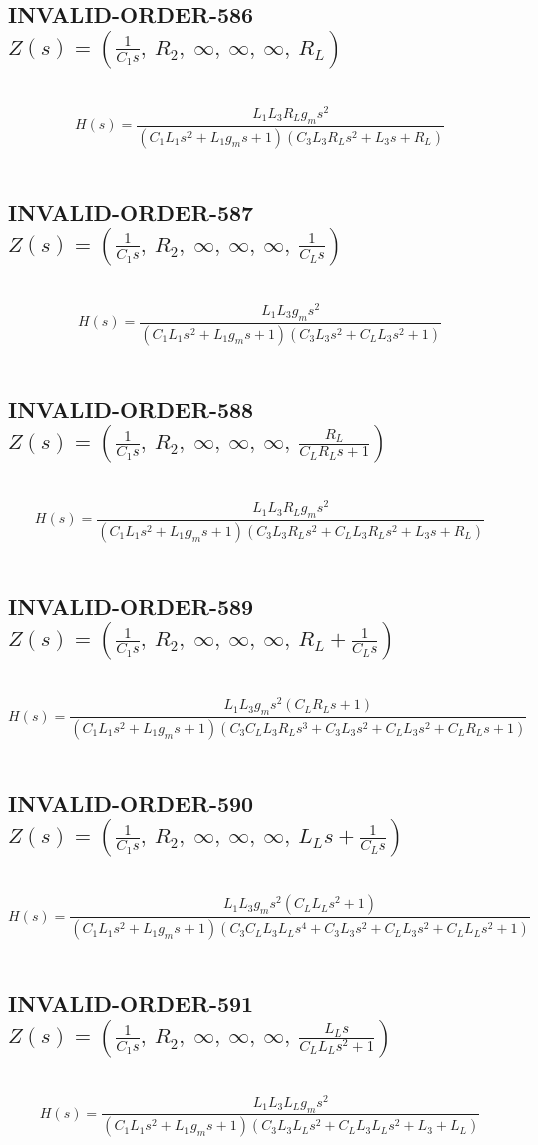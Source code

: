 \documentclass{article}
\begin{document}
\subsection{INVALID-ORDER-586 $Z(s) = \left( \frac{1}{C_{1} s}, \  R_{2}, \  \infty, \  \infty, \  \infty, \  R_{L}\right)$ } \ 
\textbf{\[H(s) = \frac{L_{1} L_{3} R_{L} g_{m} s^{2}}{\left(C_{1} L_{1} s^{2} + L_{1} g_{m} s + 1\right) \left(C_{3} L_{3} R_{L} s^{2} + L_{3} s + R_{L}\right)}\] } \ 
\subsection{INVALID-ORDER-587 $Z(s) = \left( \frac{1}{C_{1} s}, \  R_{2}, \  \infty, \  \infty, \  \infty, \  \frac{1}{C_{L} s}\right)$ } \ 
\textbf{\[H(s) = \frac{L_{1} L_{3} g_{m} s^{2}}{\left(C_{1} L_{1} s^{2} + L_{1} g_{m} s + 1\right) \left(C_{3} L_{3} s^{2} + C_{L} L_{3} s^{2} + 1\right)}\] } \ 
\subsection{INVALID-ORDER-588 $Z(s) = \left( \frac{1}{C_{1} s}, \  R_{2}, \  \infty, \  \infty, \  \infty, \  \frac{R_{L}}{C_{L} R_{L} s + 1}\right)$ } \ 
\textbf{\[H(s) = \frac{L_{1} L_{3} R_{L} g_{m} s^{2}}{\left(C_{1} L_{1} s^{2} + L_{1} g_{m} s + 1\right) \left(C_{3} L_{3} R_{L} s^{2} + C_{L} L_{3} R_{L} s^{2} + L_{3} s + R_{L}\right)}\] } \ 
\subsection{INVALID-ORDER-589 $Z(s) = \left( \frac{1}{C_{1} s}, \  R_{2}, \  \infty, \  \infty, \  \infty, \  R_{L} + \frac{1}{C_{L} s}\right)$ } \ 
\textbf{\[H(s) = \frac{L_{1} L_{3} g_{m} s^{2} \left(C_{L} R_{L} s + 1\right)}{\left(C_{1} L_{1} s^{2} + L_{1} g_{m} s + 1\right) \left(C_{3} C_{L} L_{3} R_{L} s^{3} + C_{3} L_{3} s^{2} + C_{L} L_{3} s^{2} + C_{L} R_{L} s + 1\right)}\] } \ 
\subsection{INVALID-ORDER-590 $Z(s) = \left( \frac{1}{C_{1} s}, \  R_{2}, \  \infty, \  \infty, \  \infty, \  L_{L} s + \frac{1}{C_{L} s}\right)$ } \ 
\textbf{\[H(s) = \frac{L_{1} L_{3} g_{m} s^{2} \left(C_{L} L_{L} s^{2} + 1\right)}{\left(C_{1} L_{1} s^{2} + L_{1} g_{m} s + 1\right) \left(C_{3} C_{L} L_{3} L_{L} s^{4} + C_{3} L_{3} s^{2} + C_{L} L_{3} s^{2} + C_{L} L_{L} s^{2} + 1\right)}\] } \ 
\subsection{INVALID-ORDER-591 $Z(s) = \left( \frac{1}{C_{1} s}, \  R_{2}, \  \infty, \  \infty, \  \infty, \  \frac{L_{L} s}{C_{L} L_{L} s^{2} + 1}\right)$ } \ 
\textbf{\[H(s) = \frac{L_{1} L_{3} L_{L} g_{m} s^{2}}{\left(C_{1} L_{1} s^{2} + L_{1} g_{m} s + 1\right) \left(C_{3} L_{3} L_{L} s^{2} + C_{L} L_{3} L_{L} s^{2} + L_{3} + L_{L}\right)}\] } \ 
\end{document}
